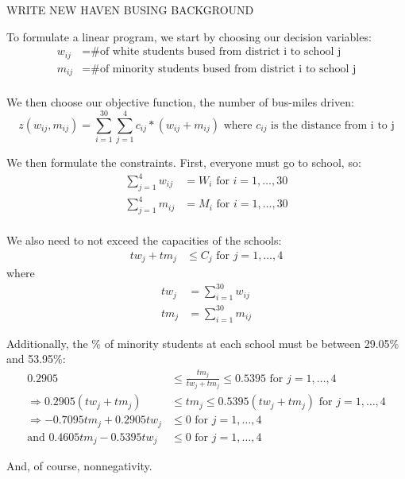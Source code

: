 \documentclass{article}
\begin{document}
\begin{eg}
    WRITE NEW HAVEN BUSING BACKGROUND
\end{eg}
\begin{answer}
    To formulate a linear program, we start by choosing our decision variables: \\
    
    \begin{align*}
        w_{ij}&=\text{\# of white students bused from district i to school j} \\
        m_{ij}&=\text{\# of minority students bused from district i to school j} \\
    \end{align*}

    We then choose our objective function, the number of bus-miles driven: \\
    \[
        z(w_{ij}, m_{ij})=\sum_{i=1}^{30} \sum_{j=1}^{4}c_{ij}*(w_{ij}+m_{ij}) \text{ where \(c_{ij}\) is the distance from i to j}
    \]

    We then formulate the constraints. First, everyone must go to school, so: \\
    \begin{align*}
        \sum_{j=1}^4 w_{ij}&=W_i \text{ for }i=1,\dots,30 \\
        \sum_{j=1}^4 m_{ij}&=M_i \text{ for }i=1,\dots,30 \\
    \end{align*}

    We also need to not exceed the capacities of the schools: \\
    \begin{align*}
        tw_j+tm_j&\leq C_j \text{ for }j=1,\dots,4
    \end{align*}
    where \\
    \begin{align*}
        tw_j&=\sum_{i=1}^{30} w_{ij} \\
        tm_j&=\sum_{i=1}^{30} m_{ij}
    \end{align*}

    Additionally, the \% of minority students at each school must be between 
    29.05\% and 53.95\%: \\
    \begin{align*}
        0.2905 &\leq \frac{tm_j}{tw_j+tm_j} \leq 0.5395 \text{ for }j=1,\dots,4 \\
        \Rightarrow 0.2905(tw_j+tm_j) &\leq tm_j \leq 0.5395(tw_j+tm_j) \text{ for }j=1,\dots,4 \\
        \Rightarrow -0.7095tm_j+0.2905tw_j &\leq 0 \text{ for }j=1,\dots,4 \\
        \text{and } 0.4605tm_j-0.5395tw_j &\leq 0 \text{ for }j=1,\dots,4   
    \end{align*}

    And, of course, nonnegativity.
\end{answer}
\end{document}
